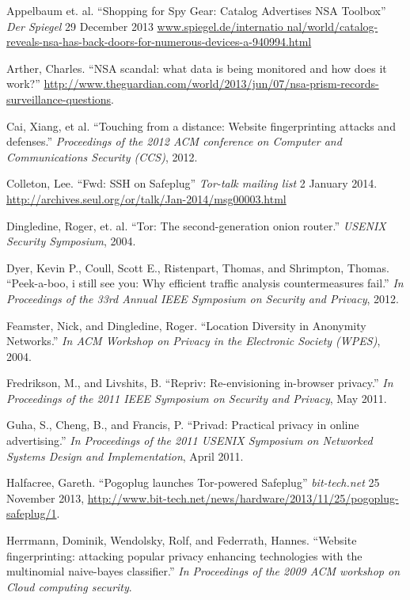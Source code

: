 \documentclass[conference]{IEEEtran}
\begin{document}
\begin{thebibliography}{1}

 Appelbaum et. al. ``Shopping for Spy Gear: Catalog Advertises 
NSA Toolbox'' \emph{Der Spiegel} 29 December 2013 \url{www.spiegel.de/internatio
nal/world/catalog-reveals-nsa-has-back-doors-for-numerous-devices-a-940994.html}

 Arther, Charles.  ``NSA scandal: what data is being monitored and how does it work?'' \url{http://www.theguardian.com/world/2013/jun/07/nsa-prism-records-surveillance-questions}.

 Cai, Xiang, et al. ``Touching from a distance: Website fingerprinting attacks and defenses.'' \emph{Proceedings of the 2012 ACM conference on Computer and Communications Security (CCS)}, 2012.

 Colleton, Lee. ``Fwd: SSH on Safeplug'' \emph{Tor-talk mailing list} 2 January 2014. \url{http://archives.seul.org/or/talk/Jan-2014/msg00003.html}

 Dingledine, Roger, et. al. ``Tor: The second-generation onion router.'' \emph{USENIX Security Symposium}, 2004.

 Dyer, Kevin P., Coull, Scott E., Ristenpart, Thomas, and Shrimpton, Thomas.  ``Peek-a-boo, i still see you: Why efficient traffic analysis countermeasures fail.'' \emph{In Proceedings of the 33rd Annual IEEE Symposium on Security and Privacy}, 2012.

 Feamster, Nick, and Dingledine, Roger.  ``Location Diversity in Anonymity Networks.''  \emph{In ACM Workshop on Privacy in the Electronic Society (WPES)}, 2004.

 Fredrikson, M., and Livshits, B. ``Repriv: Re-envisioning in-browser privacy.'' \emph{In Proceedings of the 2011 IEEE Symposium on Security and Privacy}, May 2011.

 Guha, S., Cheng, B., and Francis, P. ``Privad: Practical privacy in online advertising.'' \emph{In Proceedings of the 2011 USENIX Symposium on Networked Systems Design and Implementation}, April 2011.

 Halfacree, Gareth. ``Pogoplug launches Tor-powered Safeplug'' \emph{bit-tech.net} 25 November 2013, \url{http://www.bit-tech.net/news/hardware/2013/11/25/pogoplug-safeplug/1}.

 Herrmann, Dominik, Wendolsky, Rolf, and Federrath, Hannes.  ``Website fingerprinting: attacking popular privacy enhancing technologies with the multinomial naive-bayes classifier.'' \emph{In Proceedings of the 2009 ACM workshop on Cloud computing security}.


\end{thebibliography}
\end{document}
